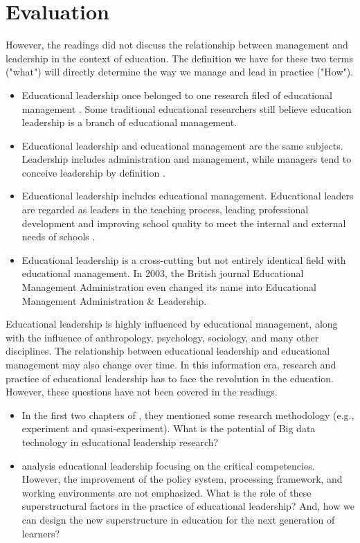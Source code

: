 \documentclass[doc,biblatex,apacite]{apa6}
\begin{document}
\section{Evaluation}
However, the readings did not discuss the relationship between management and leadership in the context of education.
The definition we have for these two terms ("what") will directly determine the way we manage and lead in practice ("How").
\begin{itemize}
    \item Educational leadership once belonged to one research filed of educational management \cite{Richmon2003}. Some traditional educational researchers still believe education leadership is a branch of educational management.
    \item Educational leadership and educational management are the same subjects. Leadership includes administration and management, while managers tend to conceive leadership by definition \cite{Hodgkinson1991}.
    \item Educational leadership includes educational management. 
          Educational leaders are regarded as leaders in the teaching process, leading professional development and improving school quality to meet the internal and external needs of schools \cite{Levin2006}.
    \item Educational leadership is a cross-cutting but not entirely identical field with educational management. 
    In 2003, the British journal Educational Management Administration even changed its name into Educational Management Administration \& Leadership.
\end{itemize}

Educational leadership is highly influenced by educational management, along with the influence of anthropology, psychology, sociology, and many other disciplines.
The relationship between educational leadership and educational management may also change over time.
In this information era, research and practice of educational leadership has to face the revolution in the education.
However, these questions have not been covered in the readings.
\begin{itemize}
    \item In the first two chapters of , they mentioned some research methodology (e.g., experiment and quasi-experiment). 
          What is the potential of Big data technology in educational leadership research?
    \item {} analysis educational leadership focusing on the critical competencies. 
          However, the improvement of the policy system, processing framework, and working environments are not emphasized.
          What is the role of these superstructural factors in the practice of educational leadership?
          And, how we can design the new superstructure in education for the next generation of learners?
\end{itemize}
\end{document}
